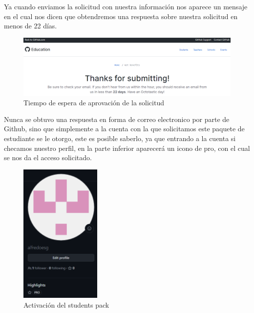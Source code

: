 \documentclass[12pt, a4paper, titlepage]{report}
\begin{document}
		Ya cuando enviamos la solicitud con nuestra información nos aparece un mensaje en el cual nos dicen que obtendremos una respuesta sobre nuestra solicitud en menos de 22 días.\par
		\begin{figure}[H]
			\includegraphics[width=12cm]{./imagenes/MarcoTeorico/GitHub/GitS2.png}
			\centering 
			\caption{Tiempo de espera de aprovación de la solicitud}
		\end{figure}
		Nunca se obtuvo una respuesta en forma de correo electronico por parte de Github, sino que simplemente a la cuenta con la que solicitamos este paquete de estudiante se le otorgo, este es posible saberlo, ya que entrando a la cuenta si checamos nuestro perfil, en la parte inferior aparecerá un icono de pro, con el cual se nos da el acceso solicitado.
		\begin{figure}[H]
			\includegraphics[width=4cm]{./imagenes/MarcoTeorico/GitHub/Githubpro.png}
			\centering 
			\caption{Activación del students pack}
		\end{figure}
\end{document}
